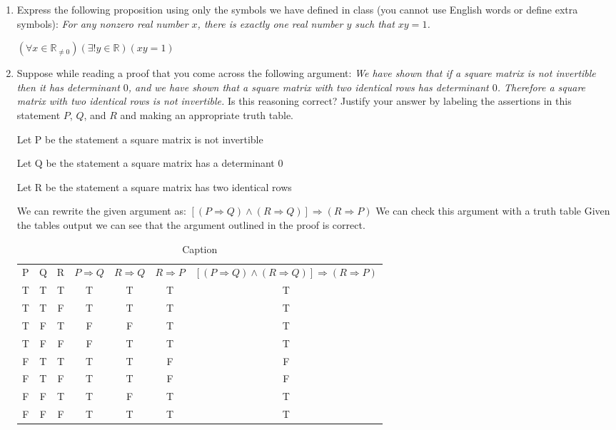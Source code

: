 \documentclass{article}
\newcommand{\bR}{\mathbb{R}}
\begin{document}
{\begin{enumerate}[labelindent=0pt,leftmargin=0pt]
\begin{enumerate}
\end{enumerate}


\item Express the following proposition using only the symbols we have
defined in class (you cannot use English words or define extra symbols):
\textit{For any nonzero real number $x$, there is exactly one real number
$y$ such that $xy=1$.}

\subitem $(\forall x \in \mathbb R_{\ne 0})(\exists!y \in\bR)(xy=1)$


\item Suppose while reading a proof that you come across the following
argument: \textit{We have shown that if a square matrix is not invertible
then it has determinant $0$, and we have shown that a square matrix with
two identical rows has determinant $0$. Therefore a square matrix with two
identical rows is not invertible.} Is this reasoning correct? Justify your
answer by labeling the assertions in this statement $P$, $Q$, and $R$ and
making an appropriate truth table.

\subitem Let P be the statement a square matrix is  not invertible

\subitem Let Q be the statement a square matrix has a determinant $0$

\subitem Let R be the statement a square matrix has two identical rows

\subitem We can rewrite the given argument as:
\subitem $[(P \Rightarrow Q) \land (R \Rightarrow Q)] \Rightarrow (R \Rightarrow P)$
\subitem We can check this argument with a truth table 
\subitem Given the tables output we can see that the argument outlined in the proof is correct. 

\begin{table}[]
    \centering
    \begin{tabular}{c|c|c|c|c|c|c}
        P & Q & R & $P \Rightarrow Q$ & $R \Rightarrow Q$ & $R \Rightarrow P$ & $[(P \Rightarrow Q) \land (R \Rightarrow Q)] \Rightarrow (R \Rightarrow P)$ \\
        T & T & T & T & T & T & T \\
        T & T & F & T & T & T & T \\
        T & F & T & F & F & T & T \\
        T & F & F & F & T & T & T \\
        F & T & T & T & T & F & F \\
        F & T & F & T & T & F & F \\
        F & F & T & T & F & T & T \\
        F & F & F & T & T & T & T \\
    \end{tabular}
    \caption{Caption}
    \label{tab:my_label}
\end{table}


\end{enumerate}}
\end{document}
